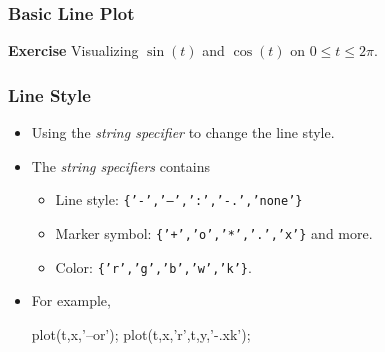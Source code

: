 \documentclass{beamer}  %
\begin{document}
\begin{frame}[fragile]
\frametitle{Basic Line Plot}
\textbf{Exercise} 
Visualizing $\sin(t)$ and $\cos(t)$ on $0 \leq t \leq 2\pi$. \pause
\begin{figure}[htb]
        \centering
\end{figure}

\end{frame}
\begin{frame}[fragile]
\frametitle{Line Style}

\begin{itemize}[<+->]
    \item Using the \textit{string specifier} to change the line style.
    \item The \textit{string specifiers} contains
          \begin{itemize}
          \item Line style: \texttt{\{'-','--',':','-.','none'\}}
          \item Marker symbol: \texttt{\{'+','o','*','.','x'\}} and more.
          \item Color: \texttt{\{'r','g','b','w','k'\}}.
          \end{itemize}
    \item For example,
          \begin{matlabcode}[numbers=none,frame=none]
          plot(t,x,'--or');
          plot(t,x,'r',t,y,'-.xk');
          \end{matlabcode}

\end{itemize}

\end{frame}
\end{document}
